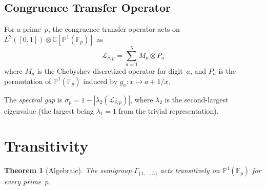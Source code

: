 \documentclass[11pt,a4paper]{amsart}
\newtheorem{theorem}{Theorem}
\theoremstyle{definition}
\begin{document}
\subsection{Congruence Transfer Operator}

For a prime~$p$, the congruence transfer operator acts on $L^2([0,1]) \otimes \mathbb{C}[\mathbb{P}^1(\mathbb{F}_p)]$ as
\[
\mathcal{L}_{\delta,p} = \sum_{a=1}^{5} M_a \otimes P_a
\]
where $M_a$ is the Chebyshev-discretized operator for digit~$a$, and $P_a$ is the permutation of $\mathbb{P}^1(\mathbb{F}_p)$ induced by $g_a : x \mapsto a + 1/x$.

The \emph{spectral gap} is $\sigma_p = 1 - |\lambda_2(\mathcal{L}_{\delta,p})|$, where $\lambda_2$ is the second-largest eigenvalue (the largest being $\lambda_1 = 1$ from the trivial representation).

\section{Transitivity}

\begin{theorem}[Algebraic]\label{thm:transitivity}
The semigroup $\Gamma_{\{1,\ldots,5\}}$ acts transitively on $\mathbb{P}^1(\mathbb{F}_p)$ for every prime~$p$.
\end{theorem}
\end{document}
